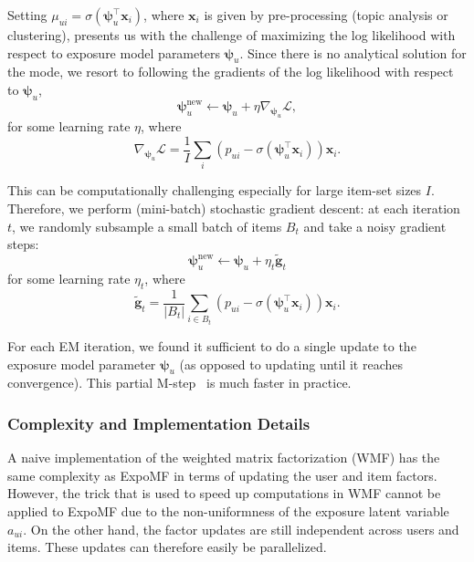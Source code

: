  Setting $\mu_{ui} = \sigma(\boldsymbol\psi_u^\top \mathbf{x}_i)$, where $\mathbf{x}_i$ is given by pre-processing (topic analysis or clustering), presents us with the challenge of maximizing the log likelihood with respect to exposure model parameters $\boldsymbol\psi_u$. Since there is no analytical solution for the mode, we resort to following the gradients of the log likelihood with respect to $\boldsymbol\psi_u$,
\begin{equation}
	\boldsymbol\psi_u^{\text{new}} \leftarrow \boldsymbol\psi_u + \eta \nabla_{\boldsymbol\psi_u} \mathcal{L}, %
	\label{eq:update_psi}
\end{equation}
for some learning rate $\eta$, where
\begin{equation}
	\nabla_{\boldsymbol\psi_u} \mathcal{L} = \textstyle \frac{1}{I}\sum_i ( p_{ui} - \sigma(\boldsymbol\psi_u^\top \mathbf{x}_i))\mathbf{x}_i.
\end{equation}

This can be computationally challenging especially for large item-set sizes $I$. Therefore, we perform (mini-batch) stochastic gradient descent: at each iteration $t$, we randomly subsample a small batch of items $B_t$ and take a noisy gradient steps:
\begin{equation} \label{eq:update_psi_sgd}
\boldsymbol\psi_u^{\text{new}} \leftarrow \boldsymbol\psi_u + \eta_t \tilde{\boldsymbol{g}}_t
\end{equation}
for some learning rate $\eta_t$, where
\begin{equation}
\tilde{\boldsymbol{g}}_t = \textstyle \frac{1}{|B_t|}\sum_{i \in B_t} (p_{ui} - \sigma(\boldsymbol\psi_u^\top \mathbf{x}_i)) \mathbf{x}_i.
\end{equation}

For each EM iteration, we found it sufficient to do a single update to the
exposure model parameter $\boldsymbol\psi_u$ (as opposed to updating until it
reaches convergence). This partial M-step~\cite{neal1998view} is much faster in
practice. 

\subsubsection*{Complexity and Implementation Details}

A naive implementation of the weighted matrix factorization (WMF) \cite{hu2008collaborative} has the same complexity as ExpoMF in terms of updating the user and item factors. However, the trick that is used to speed up computations in WMF cannot be applied to ExpoMF due to the non-uniformness of the exposure latent variable $a_{ui}$. On the other hand, the factor updates are still independent across users and items. These updates can therefore easily be parallelized.

